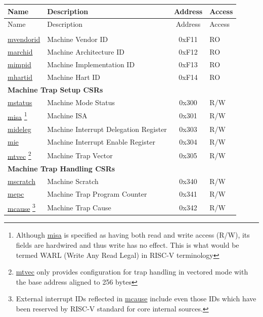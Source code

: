 
\begin{longtable}{ | p{4.0cm} | p{8.4cm} | c | l | }
\hline\rowcolor{lightgray}
Name & Description & Address & Access \\ \hline
\endfirsthead
\hline
\rowcolor{lightgray}
Name & Description & Address & Access \\
\hline
\endhead
\endfoot

\multicolumn{4}{|l|}{\textbf{Machine Information CSRs}} \\\hline
\hyperref[regdesc:MVENDORID]{mvendorid} & Machine Vendor ID & 0xF11 & RO \\\hline
\hyperref[regdesc:MARCHID]{marchid} & Machine Architecture ID & 0xF12 & RO \\\hline
\hyperref[regdesc:MIMPID]{mimpid} & Machine Implementation ID & 0xF13 & RO \\\hline
\hyperref[regdesc:MHARTID]{mhartid} & Machine Hart ID & 0xF14 & RO \\\hline
\multicolumn{4}{|l|}{\textbf{Machine Trap Setup CSRs}} \\\hline
\hyperref[regdesc:MSTATUS]{mstatus} & Machine Mode Status & 0x300 & R/W \\\hline
\hyperref[regdesc:MISA]{misa} \footnote{Although \hyperref[regdesc:MISA]{misa} is specified as having both read and write access (R/W), its fields are hardwired and thus write has no effect. This is what would be termed WARL (Write Any Read Legal) in RISC-V terminology} & Machine ISA & 0x301 & R/W \\\hline
\hyperref[regdesc:MIDELEG]{mideleg} & Machine Interrupt Delegation Register & 0x303 & R/W \\\hline
\hyperref[regdesc:MIE]{mie} & Machine Interrupt Enable Register & 0x304 & R/W \\\hline
\hyperref[regdesc:MTVEC]{mtvec} \footnote{\hyperref[regdesc:MTVEC]{mtvec} only provides configuration for trap handling in vectored mode with the base address aligned to 256 bytes} & Machine Trap Vector & 0x305 & R/W \\\hline
\multicolumn{4}{|l|}{\textbf{Machine Trap Handling CSRs}} \\\hline
\hyperref[regdesc:MSCRATCH]{mscratch} & Machine Scratch & 0x340 & R/W \\\hline
\hyperref[regdesc:MEPC]{mepc} & Machine Trap Program Counter & 0x341 & R/W \\\hline
\hyperref[regdesc:MCAUSE]{mcause} \footnote{External interrupt IDs reflected in \hyperref[regdesc:MCAUSE]{mcause} include even those IDs which have been reserved by RISC-V standard for core internal sources.} & Machine Trap Cause & 0x342 & R/W \\\hline

\end{longtable}
